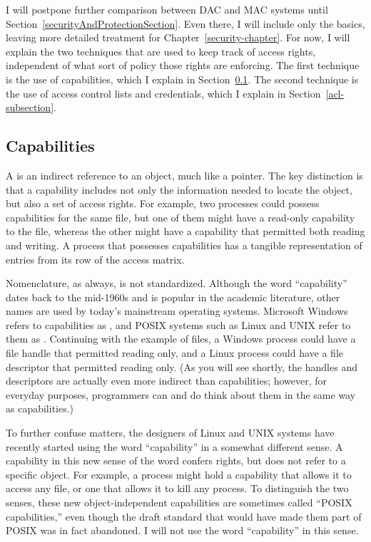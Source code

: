 I will postpone further comparison between DAC and MAC systems until
Section~\ref{securityAndProtectionSection}.  Even there, I will
include only the basics, leaving more detailed treatment for
Chapter~\ref{security-chapter}.  For now, I will explain the two
techniques that are used to keep track of access rights, independent
of what sort of policy those rights are enforcing.  The first
technique is the use of capabilities, which I explain in
Section~\ref{capabilities-subsection}.  The second technique is the
use of access control lists and credentials, which I explain in Section~\ref{acl-subsection}.

\subsection{Capabilities}\label{capabilities-subsection}

A  is an indirect reference to an object, much like
a pointer.  The key distinction is that a capability includes not only
the information needed to locate the object, but also a set of access
rights.  For example, two processes could possess capabilities for the
same file, but one of them might have a read-only capability to the
file, whereas the other might have a capability that permitted both
reading and writing.  A process that possesses capabilities has a
tangible representation of entries from its row of the access matrix.

Nomenclature, as always, is not standardized.  Although the word
``capability'' dates back to the mid-1960s and is popular in the
academic literature, other names are used by today's mainstream
operating systems.  Microsoft Windows refers to capabilities as
, and POSIX systems such as Linux and UNIX refer to
them as .  Continuing with the example of files, a
Windows process could have a file handle that permitted reading only,
and a Linux process could have a file descriptor that permitted
reading only.  (As you will see shortly, the handles and descriptors are
actually even more indirect than capabilities; however, for everyday
purposes, programmers can and do think about them in the same way as
capabilities.)

To further confuse matters, the designers of Linux and UNIX systems
have recently started using the word ``capability'' in a somewhat
different sense.  A capability in this new sense of the word confers
rights, but does not refer to a specific object.  For example, a
process might hold a capability that allows it to access any file, or
one that allows it to kill any process.  To distinguish the two
senses, these new object-independent capabilities are sometimes called
``POSIX capabilities,'' even though the
draft standard that would have made them part of POSIX was in fact
abandoned.  I will not use the word ``capability'' in this sense.

